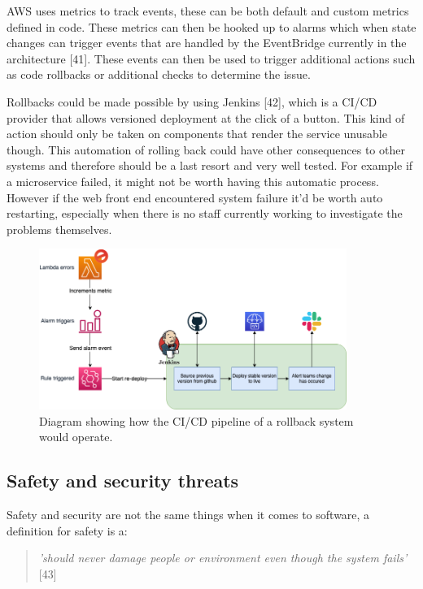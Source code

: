   AWS uses metrics to track events, these can be both default and custom metrics defined in code. These metrics can then be hooked up to alarms which 
  when state changes can trigger events that are handled by the EventBridge currently in the architecture [41]. These events can then be used to trigger
  additional actions such as code rollbacks or additional checks to determine the issue.

  Rollbacks could be made possible by using Jenkins [42], which is a CI/CD provider that allows versioned deployment at the click of a button. This kind 
  of action should only be taken on components that render the service unusable though. This automation of rolling back could have other consequences to 
  other systems and therefore should be a last resort and very well tested. For example if a microservice failed, it might not be worth having this automatic
  process. However if the web front end encountered system failure it'd be worth auto restarting, especially when there is no staff currently working to 
  investigate the problems themselves.
  
  \begin{figure}[H]
    \centering
    \includegraphics[width=10cm]{assets/rollbackPipeline.drawio.png}
    \caption{Diagram showing how the CI/CD pipeline of a rollback system would operate.}
    \label{fig:rollbackPipeline}
  \end{figure}
  
  \subsection{Safety and security threats}

  Safety and security are not the same things when it comes to software, a definition for safety is a:
  \begin{quote}
    \textit{'should never damage people or environment even though the system fails'} [43]
  \end{quote}


